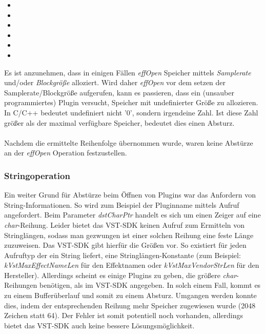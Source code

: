 \begin{itemize}
	\item {}
	\item {}
	\item {}
	\item {}
	\item {}
	\item {}
\end{itemize}

Es ist anzunehmen, dass in einigen Fällen \emph{effOpen} Speicher mittels \emph{Samplerate} und/oder \emph{Blockgröße} alloziert. Wird daher \emph{effOpen} vor dem setzen der Samplerate/Blockgröße aufgerufen, kann es passieren, dass ein (unsauber programmiertes) Plugin versucht, Speicher mit undefinierter Größe zu allozieren. In C/C++ bedeutet undefiniert nicht '0', sondern irgendeine Zahl. Ist diese Zahl größer als der maximal verfügbare Speicher, bedeutet dies einen Absturz. 
\\\\
Nachdem die ermittelte Reihenfolge übernommen wurde, waren keine Abstürze an der \emph{effOpen} Operation festzustellen. 

\subsubsection{Stringoperation}
Ein weiter Grund für Abstürze beim Öffnen von Plugins war das Anfordern von String-Informationen.
So wird zum Beispiel der Pluginname mittels  Aufruf angefordert. Beim Parameter \emph{dstCharPtr} handelt es sich um einen Zeiger auf eine \emph{char}-Reihung.
Leider bietet das VST-SDK keinen Aufruf zum Ermitteln von Stringlängen, sodass man gezwungen ist einer solchen Reihung eine feste Länge zuzuweisen. Das VST-SDK gibt hierfür die Größen vor. So existiert für jeden Aufruftyp der ein String liefert, eine Stringlängen-Konstante (zum Beispiel: \emph{kVstMaxEffectNameLen} für den Effektnamen oder \emph{kVstMaxVendorStrLen} für den Hersteller). Allerdings scheint es einige Plugins zu geben, die größere \emph{char}-Reihungen benötigen, als im VST-SDK angegeben. In solch einem Fall, kommt es zu einem Bufferüberlauf und somit zu einem Absturz. Umgangen werden konnte dies, indem der entsprechenden Reihung mehr Speicher zugewiesen wurde (2048 Zeichen statt 64). Der Fehler ist somit potentiell noch vorhanden, allerdings bietet das VST-SDK auch keine bessere Lösungsmöglichkeit.

